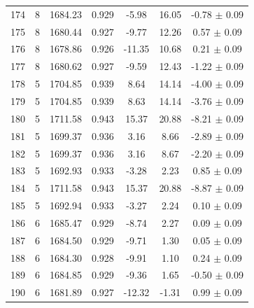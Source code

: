 \begin{longtable}{c c c c c c c}
    174 & 8 & 1684.23 & 0.929 & \cellcolor{aicyellow}-5.98 & \cellcolor{aicred}16.05 & -0.78 $\pm$ 0.09 \\
    175 & 8 & 1680.44 & 0.927 & \cellcolor{aiclightgreen}-9.77 & \cellcolor{aicred}12.26 & 0.57 $\pm$ 0.09 \\
    176 & 8 & 1678.86 & 0.926 & \cellcolor{aicgreen}-11.35 & \cellcolor{aicred}10.68 & 0.21 $\pm$ 0.09 \\
    177 & 8 & 1680.62 & 0.927 & \cellcolor{aiclightgreen}-9.59 & \cellcolor{aicred}12.43 & \cellcolor{aicorange}-1.22 $\pm$ 0.09 \\
    178 & 5 & 1704.85 & 0.939 & \cellcolor{aiclightred}8.64 & \cellcolor{aicred}14.14 & \cellcolor{aiclightred}-4.00 $\pm$ 0.09 \\
    179 & 5 & 1704.85 & 0.939 & \cellcolor{aiclightred}8.63 & \cellcolor{aicred}14.14 & \cellcolor{aiclightred}-3.76 $\pm$ 0.09 \\
    180 & 5 & 1711.58 & 0.943 & \cellcolor{aicred}15.37 & \cellcolor{aicred}20.88 & \cellcolor{aicred}-8.21 $\pm$ 0.09 \\
    181 & 5 & 1699.37 & 0.936 & \cellcolor{aiclightorange}3.16 & \cellcolor{aiclightred}8.66 & \cellcolor{aicorange}-2.89 $\pm$ 0.09 \\
    182 & 5 & 1699.37 & 0.936 & \cellcolor{aiclightorange}3.16 & \cellcolor{aiclightred}8.67 & \cellcolor{aicorange}-2.20 $\pm$ 0.09 \\
    183 & 5 & 1692.93 & 0.933 & \cellcolor{aiclightyellow}-3.28 & \cellcolor{aiclightorange}2.23 & 0.85 $\pm$ 0.09 \\
    184 & 5 & 1711.58 & 0.943 & \cellcolor{aicred}15.37 & \cellcolor{aicred}20.88 & \cellcolor{aicred}-8.87 $\pm$ 0.09 \\
    185 & 5 & 1692.94 & 0.933 & \cellcolor{aiclightyellow}-3.27 & \cellcolor{aiclightorange}2.24 & 0.10 $\pm$ 0.09 \\
    186 & 6 & 1685.47 & 0.929 & \cellcolor{aiclightgreen}-8.74 & \cellcolor{aiclightorange}2.27 & 0.09 $\pm$ 0.09 \\
    187 & 6 & 1684.50 & 0.929 & \cellcolor{aiclightgreen}-9.71 & 1.30 & 0.05 $\pm$ 0.09 \\
    188 & 6 & 1684.30 & 0.928 & \cellcolor{aiclightgreen}-9.91 & 1.10 & 0.24 $\pm$ 0.09 \\
    189 & 6 & 1684.85 & 0.929 & \cellcolor{aiclightgreen}-9.36 & 1.65 & -0.50 $\pm$ 0.09 \\
    190 & 6 & 1681.89 & 0.927 & \cellcolor{aicgreen}-12.32 & -1.31 & 0.99 $\pm$ 0.09 \\

\end{longtable}

